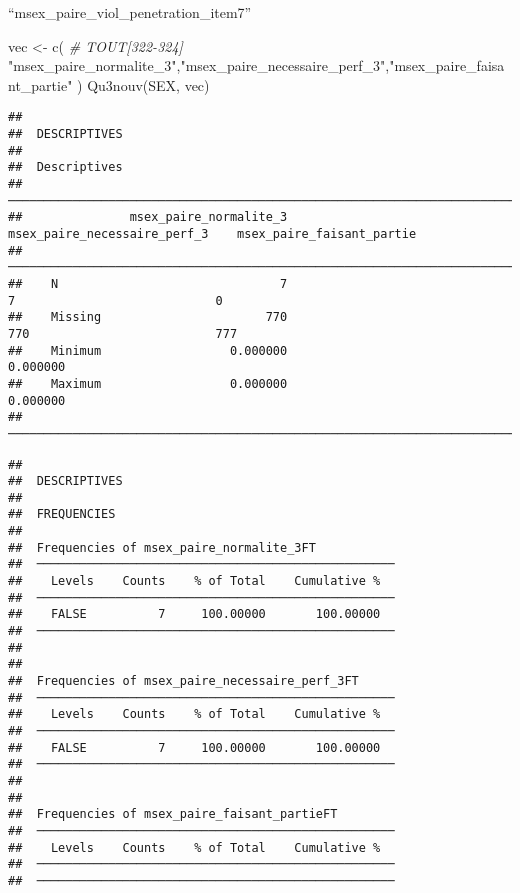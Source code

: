 \documentclass[
]{article}
\newenvironment{Shaded}{\begin{snugshade}}{\end{snugshade}}
\newcommand{\CommentTok}[1]{\textcolor[rgb]{0.56,0.35,0.01}{\textit{#1}}}
\newcommand{\FunctionTok}[1]{\textcolor[rgb]{0.00,0.00,0.00}{#1}}
\newcommand{\NormalTok}[1]{#1}
\newcommand{\OtherTok}[1]{\textcolor[rgb]{0.56,0.35,0.01}{#1}}
\newcommand{\StringTok}[1]{\textcolor[rgb]{0.31,0.60,0.02}{#1}}
\begin{document}
``msex\_paire\_viol\_penetration\_item7''

\begin{Shaded}
\begin{Highlighting}[]
\NormalTok{vec }\OtherTok{\textless{}{-}} \FunctionTok{c}\NormalTok{(  }\CommentTok{\# TOUT[322{-}324]}
  \StringTok{"msex\_paire\_normalite\_3"}\NormalTok{,}\StringTok{"msex\_paire\_necessaire\_perf\_3"}\NormalTok{,}\StringTok{"msex\_paire\_faisant\_partie"}
\NormalTok{)}
\FunctionTok{Qu3nouv}\NormalTok{(SEX, vec)}
\end{Highlighting}
\end{Shaded}

\begin{verbatim}
## 
##  DESCRIPTIVES
## 
##  Descriptives                                                                                       
##  ────────────────────────────────────────────────────────────────────────────────────────────────── 
##               msex_paire_normalite_3    msex_paire_necessaire_perf_3    msex_paire_faisant_partie   
##  ────────────────────────────────────────────────────────────────────────────────────────────────── 
##    N                               7                               7                            0   
##    Missing                       770                             770                          777   
##    Minimum                  0.000000                        0.000000                                
##    Maximum                  0.000000                        0.000000                                
##  ──────────────────────────────────────────────────────────────────────────────────────────────────
\end{verbatim}

\begin{verbatim}
## 
##  DESCRIPTIVES
## 
##  FREQUENCIES
## 
##  Frequencies of msex_paire_normalite_3FT            
##  ────────────────────────────────────────────────── 
##    Levels    Counts    % of Total    Cumulative %   
##  ────────────────────────────────────────────────── 
##    FALSE          7     100.00000       100.00000   
##  ────────────────────────────────────────────────── 
## 
## 
##  Frequencies of msex_paire_necessaire_perf_3FT      
##  ────────────────────────────────────────────────── 
##    Levels    Counts    % of Total    Cumulative %   
##  ────────────────────────────────────────────────── 
##    FALSE          7     100.00000       100.00000   
##  ────────────────────────────────────────────────── 
## 
## 
##  Frequencies of msex_paire_faisant_partieFT         
##  ────────────────────────────────────────────────── 
##    Levels    Counts    % of Total    Cumulative %   
##  ────────────────────────────────────────────────── 
##  ──────────────────────────────────────────────────
\end{verbatim}
\end{document}
